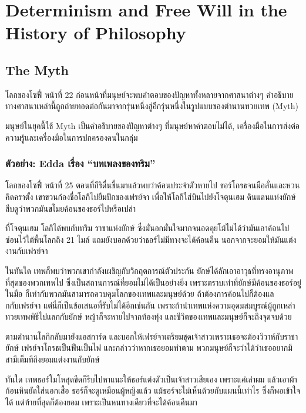 \section{Determinism and Free Will in the History of Philosophy}

\subsection{The Myth}

\begin{bookquote}{โลกของโซฟี่ หน้าที่ 22}
ก่อนหน้าที่มนุษย์จะพบคำตอบของปัญหาทั้งหลายจากศาสนาต่างๆ คำอธิบายทางศาสนาเหล่านี้ถูกถ่ายทอดต่อกันมาจากรุ่นหนึ่งสู่อีกรุ่นหนึ่งในรูปแบบของตำนานทวยเทพ (Myth)
\end{bookquote}

มนุษย์ในยุคนี้ใช้ Myth เป็นคำอธิบายของปัญหาต่างๆ ที่มนุษย์หาคำตอบไม่ได้, เครื่องมือในการส่งต่อความรู้และเครื่องมือในการปกครองคนในกลุ่ม

\subsubsection{ตัวอย่าง: Edda เรื่อง “บทเพลงของทริม”}

\begin{bookquote}{โลกของโซฟี่ หน้าที่ 25}
ตอนที่กีริดื่นขึ้นมาแล้วพบว่าค้อนประจำตัวหายไป ธอร์โกรธจนมือสั่นและหวนคิดคราตั้ง เขาขวนก้องชื่อโลกิไปยืมปีกของเฟรย์จา เพื่อให้โลกิใส่บินไปยังโจตุนเฮม ดินแดนแห่งยักษ์ สืบดูว่าพวกมันขโมยค้อนของธอร์ไปหรือเปล่า

ที่โจตุนเฮม โลกิได้พบกับทริม ราชาแห่งยักษ์ ซึ่งมั่นอกมั่นใจมากจนอดคุยโม้ไม่ได้ว่ามันเอาค้อนไปซ่อนไว้ใต้พื้นโลกถึง 21 ไมล์ แถมยังบอกด้วยว่าธอร์ไม่มีทางจะได้ค้อนคืน นอกจากจะยอมให้มันแต่งงานกับเฟรย์จา

ในทันใด เทพก็พบว่าพวกเขากำลังเผชิญกับวิกฤตการณ์ตัวประกัน ยักษ์ได้ลักเอาอาวุธที่ทรงอานุภาพที่สุดของพวกเทพไป ซึ่งเป็นสถานการณ์ที่ยอมไม่ได้เป็นอย่างยิ่ง เพราะตราบเท่าที่ยักษ์มีค้อนของธอร์อยู่ในมือ ก็เท่ากับพวกมันสามารถควบคุมโลกของเทพและมนุษย์ด้วย ถ้าต้องการค้อนไปก็ต้องแลกกับเฟรย์จา แต่นี่ก็เป็นข้อเสนอที่รับไม่ได้อีกเช่นกัน เพราะถ้านำเทพแห่งความอุดมสมบูรณ์ผู้ถูกเหล่าทวยเทพพิธีไปแลกกับยักษ์ หญ้าก็จะหายไปจากท้องทุ่ง และชีวิตของเทพและมนุษย์ก็จะถึงจุดจบด้วย

ตามตำนานโลกิกลับมายังแอสการ์ด และบอกให้เฟรย์จาเตรียมชุดเจ้าสาวเพราะเธอจะต้องวิวาห์กับราชายักษ์ เฟรย์จาโกรธเป็นฟืนเป็นไฟ และกล่าวว่าหากเธอยอมทำตาม พวกมนุษย์ก็จะว่าได้ว่าเธออยากมีสามีเต็มทีถึงยอมแต่งงานกับยักษ์

ทันใด เทพธอร์โมโหสุดขีดก็รีบไปหาแนะให้ธอร์แต่งตัวเป็นเจ้าสาวเสียเอง เพราะแค่เล่าผม แล้วเอาผ้าก้อนหินยัดใส่นอกเสื้อ ธอร์ก็จะดูเหมือนผู้หญิงแล้ว แม้ธอร์จะไม่เห็นด้วยกับแผนนี้เท่าไร ซึ่งก็พอเข้าใจได้ แต่ท้ายที่สุดก็ต้องยอม เพราะเป็นหนทางเดียวที่จะได้ค้อนคืนมา
\end{bookquote}

